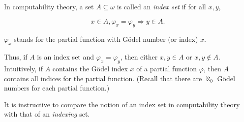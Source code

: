 \documentclass[12pt]{article}
\begin{document}
In computability theory, a set $A\subseteq\omega$ is called an \emph{index set} if for all $x, y$,

\begin{equation*}
x\in A, \varphi_x=\varphi_y \Longrightarrow y\in A.
\end{equation*} 

$\varphi_x$ stands for the partial function with G\"odel number (or index) $x$.

Thus, if $A$ is an index set and $\varphi_x=\varphi_y$, then either $x, y\in A$ or $x, y\not\in A$. Intuitively, if $A$ contains the G\"odel index $x$ of a partial function $\varphi$, then $A$ contains all indices for the partial function. (Recall that there are $\aleph_0$ G\"odel numbers for each partial function.)

It is instructive to compare the notion of an index set in computability theory with that of an \emph{indexing} set.
\end{document}
